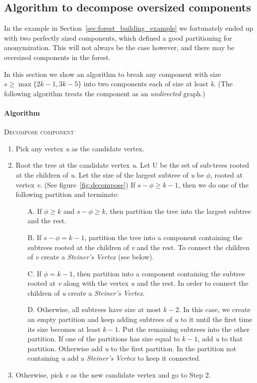 \subsection{Algorithm to decompose oversized components}\label{subsec:algorithm-to-decompose-oversized-components}

In the example in Section~\ref{sec:forest_building_example} we fortunately ended up with two perfectly sized components, which defined a good partitioning for anonymization.
This will not always be the case however, and there may be oversized components in the forest.

In this section we show an algorithm to break any component with size \(s \ge \max \{ 2k-1, 3k-5 \} \) into two components each of size at least \textit{k}. (The following algorithm treats the component as an \emph{undirected} graph.)

\paragraph{Algorithm} \textsc{Decompose component}~\cite{aggarwal}

\begin{enumerate}
    \item Pick any vertex \textit{u} as the candidate vertex.
    \item Root the tree at the candidate vertex \textit{u}.
    Let U be the set of sub-trees rooted at the children of \textit{u}.
    Let the size of the largest subtree of \textit{u} be \( \phi \), rooted at vertex \textit{v}. (See figure~\ref{fig:decompose}) If \(s-\phi \ge k-1\), then we do one of the following partition and terminate:
    \begin{enumerate}
        \item[A.] If \(\phi \ge k\) and \(s-\phi \ge k\), then partition the tree into the largest subtree and the rest.
        \item[B.] If \(s-\phi = k-1\), partition the tree into a component containing the subtrees rooted at the children of \textit{v} and the rest.
        To connect the children of \textit{v} create a \emph{Steiner's Vertex} (see below).
        \item[C.] If \(\phi = k-1\), then partition into a component containing the subtree rooted at \textit{v} along with the vertex \textit{u} and the rest.
        In order to connect the children of \textit{u} create a \emph{Steiner's Vertex}.
        \item[D.] Otherwise, all subtrees have size at most \(k-2\).
        In this case, we create an empty partition and keep adding subtrees of \textit{u} to it until the first time its size becomes at least \(k-1\).
        Put the remaining subtrees into the other partition.
        If one of the partitions has size equal to \(k-1\), add \textit{u} to that partition.
        Otherwise add \textit{u} to the first partition.
        In the partition not containing \textit{u} add a \emph{Steiner's Vertex} to keep it connected.
    \end{enumerate}
    \item Otherwise, pick \textit{v} as the new candidate vertex and go to Step 2.
\end{enumerate}

